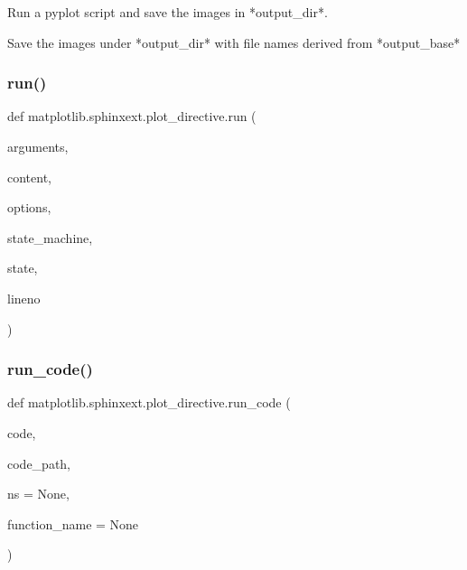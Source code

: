 \begin{DoxyVerb}Run a pyplot script and save the images in *output_dir*.

Save the images under *output_dir* with file names derived from
*output_base*
\end{DoxyVerb}
 \mbox{\label{namespacematplotlib_1_1sphinxext_1_1plot__directive_a41db11b9d15fcf83873b030653ed826f}} 
\subsubsection{\texorpdfstring{run()}{run()}}
{\footnotesize\ttfamily def matplotlib.\+sphinxext.\+plot\+\_\+directive.\+run (\begin{DoxyParamCaption}\item[{}]{arguments,  }\item[{}]{content,  }\item[{}]{options,  }\item[{}]{state\+\_\+machine,  }\item[{}]{state,  }\item[{}]{lineno }\end{DoxyParamCaption})}

\mbox{\label{namespacematplotlib_1_1sphinxext_1_1plot__directive_a65985d5db4ce353396cba45f21113a7c}} 
\subsubsection{\texorpdfstring{run\+\_\+code()}{run\_code()}}
{\footnotesize\ttfamily def matplotlib.\+sphinxext.\+plot\+\_\+directive.\+run\+\_\+code (\begin{DoxyParamCaption}\item[{}]{code,  }\item[{}]{code\+\_\+path,  }\item[{}]{ns = {\ttfamily None},  }\item[{}]{function\+\_\+name = {\ttfamily None} }\end{DoxyParamCaption})}

